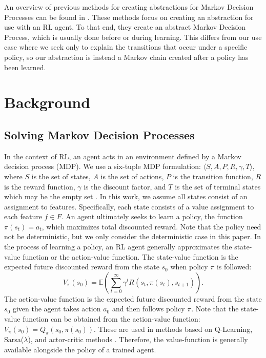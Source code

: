 \documentclass[letterpaper]{article} %
\begin{document}
An overview of previous methods for creating abstractions for Markov Decision Processes can be found in \cite{UnifiedAbstraction}. These methods focus on creating an abstraction for use with an RL agent. To that end, they create an abstract Markov Decision Process, which is usually done before or during learning.
This differs from our use case where we seek only to explain the transitions that occur under a specific policy, so our abstraction is instead a Markov chain created after a policy has been learned.

\section{Background}
\subsection{Solving Markov Decision Processes} \label{background_MDPs}
In the context of RL, an agent acts in an environment defined by a Markov decision process (MDP).
We use a six-tuple MDP formulation: $\langle S, A, P, R, \gamma, T \rangle$, where $S$ is the set of states, $A$ is the set of actions, $P$ is the transition function, $R$ is the reward function, $\gamma$ is the discount factor, and $T$ is the set of terminal states which may be the empty set \cite{SuttonAndBarto}.
In this work, we assume all states consist of an assignment to features.
Specifically, each state consists of a value assignment to each feature $f \in F$.
An agent ultimately seeks to learn a policy, the function $\pi(s_t) = a_t$, which maximizes total discounted reward.
Note that the policy need not be deterministic, but we only consider the deterministic case in this paper.
In the process of learning a policy, an RL agent generally approximates the state-value function or the action-value function.
The state-value function is the expected future discounted reward from the state $s_0$ when policy $\pi$ is followed:
\begin{equation} \label{value}
V_{\pi}(s_0) = \mathbb{E} \left( \sum_{t=0}^{\infty} \gamma^t R(s_t, \pi(s_t), s_{t+1} ) \right).
\end{equation}
The action-value function is the expected future discounted reward from the state $s_0$ given the agent takes action $a_0$ and then follows policy $\pi$.
Note that the state-value function can be obtained from the action-value function: $V_{\pi}(s_0) = Q_{\pi}(s_0, \pi(s_0))$.
These are used in methods based on Q-Learning, Sarsa($\lambda$), and actor-critic methods \cite{SuttonAndBarto}.
Therefore, the value-function is generally available alongside the policy of a trained agent.
\end{document}
